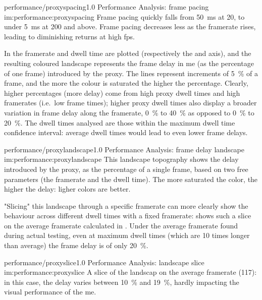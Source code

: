 \begin{image}
	{performance/proxyspacing}{1.0}
	{Performance Analysis: frame pacing}
	{im:performance:proxyspacing}
	{}
	{Frame pacing quickly falls from \SI{50}{\milli\second} at \SI{20}{\fps}, to under \SI{5}{\milli\second} at \SI{200}{\fps} and above. Frame pacing decreases less as the \gls{framerate} rises, leading to diminishing returns at high \gls{fps}.}
\end{image}

In  the \gls{framerate} and dwell time are plotted (respectively the  and  axis), and the resulting coloured landscape represents the frame delay in \gls{me} (as the percentage of one frame) introduced by the \gls{proxy}. The lines represent increments of \SI{5}{\percent} of a frame, and the more the colour is saturated the higher the percentage. Clearly, higher percentages (more delay) come from high \gls{proxy} dwell times and high \glspl{framerate} (i.e.\ low frame times); higher \gls{proxy} dwell times also display a broader variation in frame delay along the \gls{framerate}, \SI{0}{\percent} to \SI{40}{\percent} as opposed to \SI{0}{\percent} to \SI{20}{\percent}. The dwell times analysed are those within the maximum dwell time confidence interval: average dwell times would lead to even lower frame delays.

\begin{image}
	{performance/proxylandscape}{1.0}
	{Performance Analysis: frame delay landscape}
	{im:performance:proxylandscape}
	{}
	{This landscape topography shows the delay introduced by the \gls{proxy}, as the percentage of a single frame, based on two free parameters (the \gls{framerate} and the dwell time). The more saturated the color, the higher the delay: ligher colors are better.}
\end{image}

"Slicing" this landscape through a specific \gls{framerate} can more clearly show the behaviour across different dwell times with a fixed \gls{framerate}:  shows such a slice on the average \gls{framerate} calculated in . Under the average \gls{framerate} found during actual testing, even at maximum dwell times (which are \num{10} times longer than average) the frame delay is of only \SI{20}{\percent}.

\begin{image}
	{performance/proxyslice}{1.0}
	{Performance Analysis: landscape slice}
	{im:performance:proxyslice}
	{}
	{A slice of the landscap on the average \gls{framerate} (\SI{117}{\fps}): in this case, the delay varies between \SI{10}{\percent} and \SI{19}{\percent}, hardly impacting the visual performance of the \gls{me}.}
\end{image}

